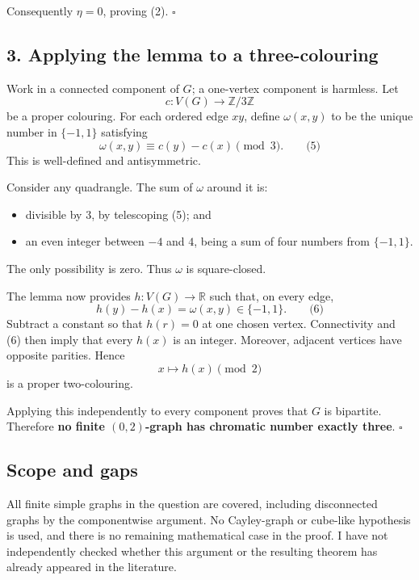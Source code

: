 \documentclass[
  11pt,
  a4paper,
]{article}
\providecommand{\tightlist}{%
  \setlength{\itemsep}{0pt}\setlength{\parskip}{0pt}}
\begin{document}
Consequently \(\eta=0\), proving (2). \(\square\)

\subsection{3. Applying the lemma to a
three-colouring}\label{applying-the-lemma-to-a-three-colouring}

Work in a connected component of \(G\); a one-vertex component is
harmless. Let \[
c:V(G)\longrightarrow \mathbb Z/3\mathbb Z
\] be a proper colouring. For each ordered edge \(xy\), define
\(\omega(x,y)\) to be the unique number in \(\{-1,1\}\) satisfying \[
\omega(x,y)\equiv c(y)-c(x)\pmod 3.
\qquad\text{(5)}
\] This is well-defined and antisymmetric.

Consider any quadrangle. The sum of \(\omega\) around it is:

\begin{itemize}
\tightlist
\item
  divisible by \(3\), by telescoping (5); and
\item
  an even integer between \(-4\) and \(4\), being a sum of four numbers
  from \(\{-1,1\}\).
\end{itemize}

The only possibility is zero. Thus \(\omega\) is square-closed.

The lemma now provides \(h:V(G)\to\mathbb R\) such that, on every edge,
\[
h(y)-h(x)=\omega(x,y)\in\{-1,1\}.
\qquad\text{(6)}
\] Subtract a constant so that \(h(r)=0\) at one chosen vertex.
Connectivity and (6) then imply that every \(h(x)\) is an integer.
Moreover, adjacent vertices have opposite parities. Hence \[
x\longmapsto h(x)\pmod 2
\] is a proper two-colouring.

Applying this independently to every component proves that \(G\) is
bipartite. Therefore \textbf{no finite \((0,2)\)-graph has chromatic
number exactly three}. \(\square\)

\subsection{Scope and gaps}\label{scope-and-gaps}

All finite simple graphs in the question are covered, including
disconnected graphs by the componentwise argument. No Cayley-graph or
cube-like hypothesis is used, and there is no remaining mathematical
case in the proof. I have not independently checked whether this
argument or the resulting theorem has already appeared in the
literature.
\end{document}
